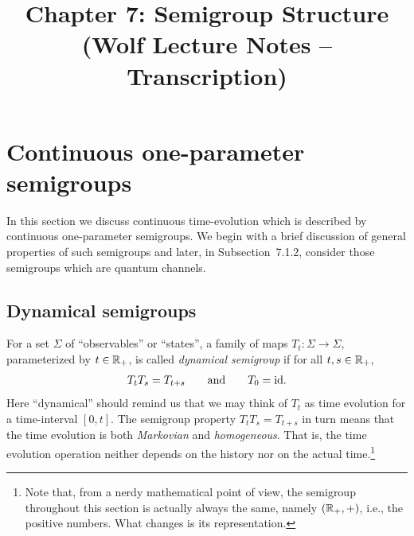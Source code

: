 \documentclass[11pt,a4paper]{article}
\title{Chapter 7: Semigroup Structure \\ {\small (Wolf Lecture Notes -- Transcription)}}
\date{}
\theoremstyle{plain}
\begin{document}
\maketitle
\tableofcontents

\section{Continuous one-parameter semigroups}

In this section we discuss continuous time-evolution which is described by continuous one-parameter semigroups. We begin with a brief discussion of general properties of such semigroups and later, in Subsection~7.1.2, consider those semigroups which are quantum channels.

\subsection{Dynamical semigroups}

For a set $\Sigma$ of ``observables'' or ``states'', a family of maps $T_t:\Sigma\to\Sigma$, parameterized by $t\in\mathbb{R}_{+}$, is called \emph{dynamical semigroup} if for all $t,s\in\mathbb{R}_{+}$,
\begin{equation}\label{eq:7.1}
    T_tT_s = T_{t+s}
    \qquad\text{and}\qquad
    T_0 = \mathrm{id}.
\end{equation}
Here ``dynamical'' should remind us that we may think of $T_t$ as time evolution for a time-interval $[0,t]$. The semigroup property $T_tT_s=T_{t+s}$ in turn means that the time evolution is both \emph{Markovian} and \emph{homogeneous}. That is, the time evolution operation neither depends on the history nor on the actual time.\footnote{Note that, from a nerdy mathematical point of view, the semigroup throughout this section is actually always the same, namely $(\mathbb{R}_{+},+)$, i.e., the positive numbers. What changes is its representation.}
\end{document}
